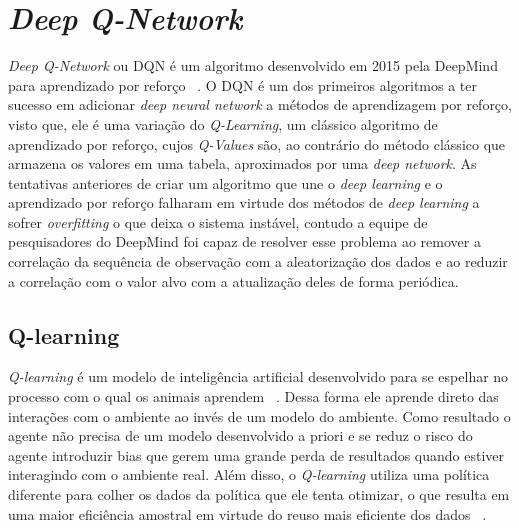 

\chapter{\emph{Deep Q-Network}}
\label{cap:dqn}


\enlargethispage{.5\baselineskip}
\emph{Deep Q-Network} ou DQN é um algoritmo desenvolvido em 2015 pela DeepMind para aprendizado por reforço ~\citep{Human-level-control}. O DQN é um dos primeiros algoritmos a ter sucesso em adicionar \emph{deep neural network} a métodos de aprendizagem por reforço, visto que, ele é uma variação do \emph{Q-Learning}, um clássico algoritmo de aprendizado por reforço, cujos \emph{Q-Values} são, ao contrário do método clássico que armazena os valores em uma tabela, aproximados por uma \emph{deep network}. As tentativas anteriores de criar um algoritmo que une o \emph{deep learning} e o aprendizado por reforço falharam em virtude dos métodos de \emph{deep learning} a sofrer \emph{overfitting} o que deixa o sistema instável, contudo a equipe de pesquisadores do DeepMind foi capaz de resolver esse problema ao remover a correlação da sequência de observação com a aleatorização dos dados e ao reduzir a correlação com o valor alvo com a atualização deles de forma periódica.

\section{Q-learning}
\label{sec:q-learning}

\enlargethispage{.5\baselineskip}

\emph{Q-learning} é um modelo de inteligência artificial desenvolvido para se espelhar no processo com o qual os animais aprendem ~\citep{Watkins:PhD}. Dessa forma ele aprende direto das interações com o ambiente ao invés de um modelo do ambiente. Como resultado o agente não precisa de um modelo desenvolvido a priori e se reduz o risco do agente introduzir bias que gerem uma grande perda de resultados quando estiver interagindo com o ambiente real. Além disso, o \emph{Q-learning} utiliza uma política diferente para colher os dados da política que ele tenta otimizar, o que resulta em uma maior eficiência amostral em virtude do reuso mais eficiente dos dados ~\citep{Nguyen_La_2019}.


